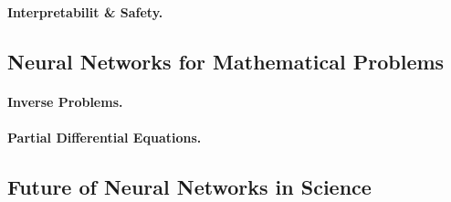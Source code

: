 \documentclass[a4paper, pagesize, DIV=15,
               12pt, parskip=full,
               bibliography=totocnumbered]{scrartcl}
\begin{document}
\paragraph{Interpretabilit \& Safety.}

\subsection{Neural Networks for Mathematical Problems}

\paragraph{Inverse Problems.}

\paragraph{Partial Differential Equations.}

\subsection{Future of Neural Networks in Science}













\clearpage

{}
\end{document}
